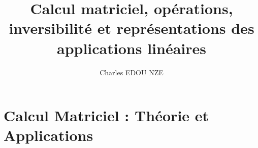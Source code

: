 \documentclass[12pt,a4paper]{report}
\title{Calcul matriciel, opérations, inversibilité et représentations des applications linéaires}
\author{Charles EDOU NZE}
\date{}
\begin{document}
\maketitle
\tableofcontents

\chapter{Calcul Matriciel : Théorie et Applications}
\end{document}
